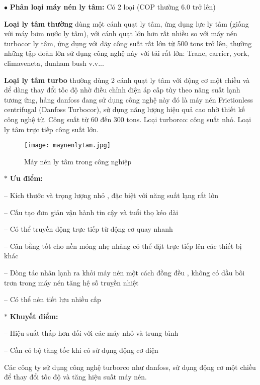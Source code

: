 \begin{enumerate}[leftmargin=0.5cm]
		$ \bullet $ \textbf{Phân loại máy nén ly tâm:} Có 2 loại (COP thường 6.0 trở lên)
		
		\textbf{Loại ly tâm thường} dùng một cánh quạt ly tâm, ứng dụng lực ly tâm (giống với máy bơm nước ly tâm), với cánh quạt lớn hơn rất nhiều so với máy nén turbocor ly tâm, ứng dụng với dãy công suất rất lớn từ 500 tons trở lên, thường những tập đoàn lớn sử dụng công nghệ này với tải rất lớn: Trane, carrier, york, climaveneta, dunham bush v.v...
		
		\textbf{Loại ly tâm turbo} thường dùng 2 cánh quạt ly tâm với động cơ một chiều và dể dàng thay đổi tốc độ nhờ điều chỉnh điện áp cấp tùy theo năng suất lạnh tương ứng, hảng danfoss đang sử dụng công nghệ này đó là máy nén Frictionless centrifugal (Danfoss Turbocor), sử dụng năng lượng hiệu quả cao nhờ thiết kế công nghệ từ. Công suất từ 60 đến 300 tons. Loại turborco: công suất nhỏ. Loại ly tâm trực tiếp công suất lớn.

\begin{figure}[H]
	\centering
	\texttt{[image: maynenlytam.jpg]}
	\caption{Máy nén ly tâm trong công nghiệp}
\end{figure}			
		
		$ \ast $ \textbf{Ưu điểm:} 
		
		-- Kích thước và trọng lượng nhỏ , đặc biệt với năng suất lạng rất lớn
		
		-- Cấu tạo đơn giản vận hành tin cậy và tuổi thọ kéo dài
		
		-- Có thể truyền động trực tiếp từ động cơ quay nhanh
		
		-- Cân bằng tốt cho nền móng nhẹ nhàng có thể đặt trực tiếp lên các thiết bị khác
		
		-- Dòng tác nhân lạnh ra khỏi máy nén một cách đồng đều , không có dầu bôi trơn trong máy nén tăng hệ số truỵền nhiệt
		
		-- Có thể nén tiết lưu nhiều cấp 
		
		$ \ast $ \textbf{Khuyết điểm:} 
		
		-- Hiệu suất thấp hơn đối với các máy nhỏ và trung bình
		
		-- Cần có bộ tăng tốc khi có sử dụng động cơ điện
		
		Các công ty sử dụng công nghệ turborco như danfoss, sử dụng động cơ một chiều để thay đổi tốc độ và tăng hiệu suất máy nén.
		
	\end{enumerate}
	
